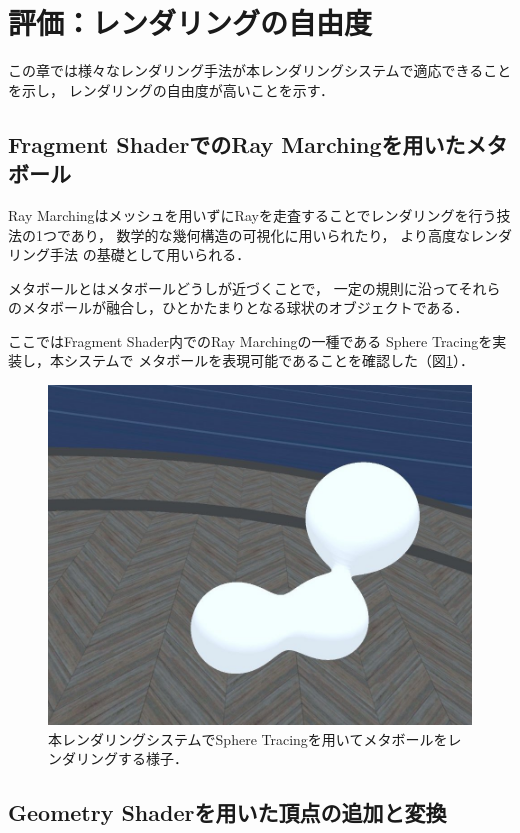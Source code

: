 \section{評価：レンダリングの自由度}

この章では様々なレンダリング手法が本レンダリングシステムで適応できることを示し，
レンダリングの自由度が高いことを示す．

\subsection{Fragment ShaderでのRay Marchingを用いたメタボール}

Ray Marchingはメッシュを用いずにRayを走査することでレンダリングを行う技法の1つであり，
数学的な幾何構造の可視化\cite{ray-marching-math}に用いられたり，
より高度なレンダリング手法\cite{ray-marching-advanced1}\cite{ray-marching-advanced2}
の基礎として用いられる．

メタボール\cite{meta-ball}とはメタボールどうしが近づくことで，
一定の規則に沿ってそれらのメタボールが融合し，ひとかたまりとなる球状のオブジェクトである．

ここではFragment Shader内でのRay Marchingの一種である
Sphere Tracing\cite{sphere-tracing}を実装し，本システムで
メタボールを表現可能であることを確認した（図\ref{fig:meta-ball}）．

\begin{figure}[htbp]
  \centering
  \includegraphics[keepaspectratio, width=0.7\linewidth]{figures/meta-ball.png}
  \caption{
    本レンダリングシステムでSphere Tracingを用いてメタボールをレンダリングする様子．
  }
  \label{fig:meta-ball}
\end{figure}

\subsection{Geometry Shaderを用いた頂点の追加と変換}


